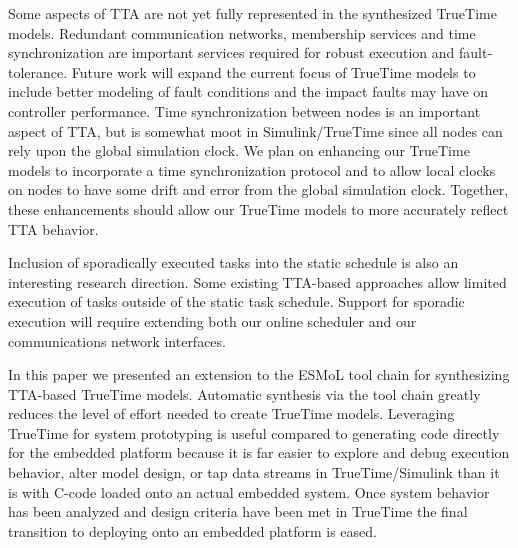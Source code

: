 Some aspects of TTA are not yet fully represented in the synthesized TrueTime models.  Redundant communication networks, membership services and time synchronization are important services required for robust execution and fault-tolerance.  Future work will expand the current focus of TrueTime models to include better modeling of fault conditions and the impact faults may have on controller performance.  Time synchronization between nodes is an important aspect of TTA, but is somewhat moot in Simulink/TrueTime since all nodes can rely upon the global simulation clock.  We plan on enhancing our TrueTime models to incorporate a time synchronization protocol and to allow local clocks on nodes to have some drift and error from the global simulation clock.  Together, these enhancements should allow our TrueTime models to more accurately reflect TTA behavior.

Inclusion of sporadically executed tasks into the static schedule is also an interesting research direction.  Some existing TTA-based approaches allow limited execution of tasks outside of the static task schedule.  Support for sporadic execution will require extending both our online scheduler and our communications network interfaces.

In this paper we presented an extension to the ESMoL tool chain for synthesizing TTA-based TrueTime models.  Automatic synthesis via the tool chain greatly reduces the level of effort needed to create TrueTime models.  Leveraging TrueTime for system prototyping is useful compared to generating code directly for the embedded platform because it is far easier to explore and debug execution behavior, alter model design, or tap data streams in TrueTime/Simulink than it is with C-code loaded onto an actual embedded system.  Once system behavior has been analyzed and design criteria have been met in TrueTime the final transition to deploying onto an embedded platform is eased.